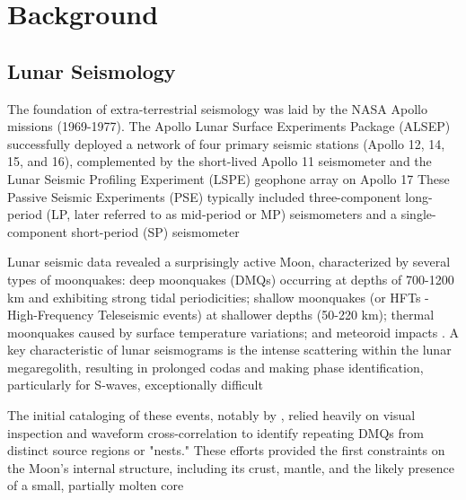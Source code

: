 \documentclass[conference]{IEEEtran}
\begin{document}
\section{Background}
    \subsection{Lunar Seismology}
        The foundation of extra-terrestrial seismology was laid by the NASA Apollo missions (1969-1977). The Apollo
        Lunar Surface Experiments Package (ALSEP) successfully deployed a network of four primary seismic stations
        (Apollo 12, 14, 15, and 16), complemented by the short-lived Apollo 11 seismometer and the Lunar Seismic
        Profiling Experiment (LSPE) geophone array on Apollo 17 \cite{Nakamura1982, Lognonne2005, Nunn2020}
        These Passive Seismic Experiments (PSE) typically included three-component long-period (LP, later referred to as
        mid-period or MP) seismometers and a single-component short-period (SP) seismometer
        \cite{Nunn2020}%

        Lunar seismic data revealed a surprisingly active Moon, characterized by several types of moonquakes: deep
        moonquakes (DMQs) occurring at depths of 700-1200 km and exhibiting strong tidal periodicities; shallow
        moonquakes (or HFTs - High-Frequency Teleseismic events) at shallower depths (50-220 km); thermal moonquakes
        caused by surface temperature variations; and meteoroid impacts \cite{Nakamura1982, Lognonne2005}
        . A key characteristic of lunar seismograms is the intense scattering within the lunar megaregolith, resulting
        in prolonged codas and making phase identification, particularly for S-waves, exceptionally difficult
        \cite{Dainty1981, Garcia2019}

        The initial cataloging of these events, notably by \cite{Nakamura1982}, relied heavily on visual inspection and
        waveform cross-correlation to identify repeating DMQs from distinct source regions or "nests." These efforts
        provided the first constraints on the Moon's internal structure, including its crust, mantle, and the likely
        presence of a small, partially molten core \cite{Weber2011,Garcia2019}
\end{document}
